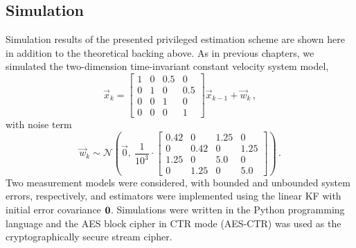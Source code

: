 \subsection{Simulation}\label{subsec:priv_estimation:est_simulation}
Simulation results of the presented privileged estimation scheme are shown here in addition to the theoretical backing above. As in previous chapters, we simulated the two-dimension time-invariant constant velocity system model,
\begin{equation}\label{eq:priv_estimation:est_simulation_system_model}
    \vec{x}_k = 
    \begin{bmatrix}
        1 & 0 & 0.5 & 0\\
        0 & 1 & 0 & 0.5\\
        0 & 0 & 1 & 0\\
        0 & 0 & 0 & 1
    \end{bmatrix}
    \vec{x}_{k-1} + \vec{w}_k\,,
\end{equation}
with noise term
\begin{equation}
    \vec{w}_k \sim \mathcal{N}\left(\vec{0},\ \frac{1}{10^{3}}\cdot
    \begin{bmatrix}
        0.42 & 0 & 1.25 & 0\\
        0 & 0.42 & 0 & 1.25\\
        1.25 & 0 & 5.0 & 0\\
        0 & 1.25 & 0 & 5.0
    \end{bmatrix}
    \right)\,.
\end{equation}
Two measurement models were considered, with bounded and unbounded system errors, respectively, and estimators were implemented using the linear KF with initial error covariance ${{\mathbf{0}}}$. Simulations were written in the Python programming language and the AES block cipher in CTR mode (AES-CTR) \cite{gueronIntelAdvancedEncryption2010} was used as the cryptographically secure stream cipher.

